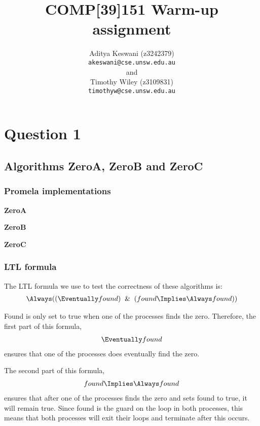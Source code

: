 \documentclass[12pt,a4paper]{scrartcl}
\begin{document}
\title{COMP[39]151 Warm-up assignment}
\author{Aditya Keswani (z3242379) \\ 
        \texttt{akeswani@cse.unsw.edu.au} \\ 
        and \\ 
        Timothy Wiley (z3109831) \\
        \texttt{timothyw@cse.unsw.edu.au} }

\maketitle

\section{Question 1}

\subsection{Algorithms ZeroA, ZeroB and ZeroC}

\subsubsection{Promela implementations}

\textbf{ZeroA}


\textbf{ZeroB}


\textbf{ZeroC}


\subsubsection{LTL formula}

The LTL formula we use to test the correctness of these algorithms is:
\begin{align} \Always ( ( \Eventually found ) \And ( found \Implies \Always found ) ) \end{align}

Found is only set to true when one of the processes finds the zero. Therefore, the first part of this formula, 
\begin{align} \Eventually found \end{align}
ensures that one of the processes does eventually find the zero. 

The second part of this formula, 
\begin{align} found \Implies \Always found \end{align} 
ensures that after one of the processes finds the zero and sets found to true, it will remain true. Since found is the guard on the loop in both processes, this means that both processes will exit their loops and terminate after this occurs.
\end{document}
